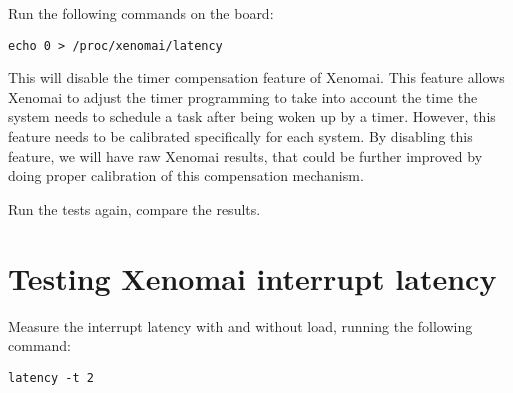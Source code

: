 Run the following commands on the board:

\begin{verbatim}
echo 0 > /proc/xenomai/latency
\end{verbatim}

This will disable the timer compensation feature of Xenomai. This
feature allows Xenomai to adjust the timer programming to take into
account the time the system needs to schedule a task after being woken
up by a timer. However, this feature needs to be calibrated
specifically for each system. By disabling this feature, we will have
raw Xenomai results, that could be further improved by doing proper
calibration of this compensation mechanism.

Run the tests again, compare the results.

\section{Testing Xenomai interrupt latency}

Measure the interrupt latency with and without load, running the
following command:

\begin{verbatim}
latency -t 2
\end{verbatim}
